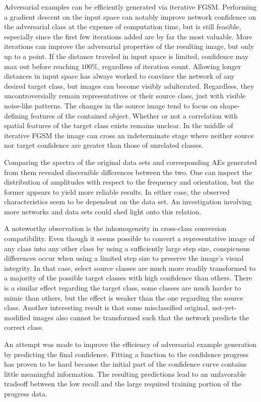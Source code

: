 \documentclass[11pt, a4paper]{article}
\begin{document}
Adversarial examples can be efficiently generated via iterative FGSM. Performing a gradient descent on the input space can notably improve network confidence on the adversarial class at the expense of computation time, but is still feasible, especially since the first few iterations added are by far the most valuable. More iterations can improve the adversarial properties of the resulting image, but only up to a point. If the distance traveled in input space is limited, confidence may max out before reaching $100\%$, regardless of iteration count. Allowing longer distances in input space has always worked to convince the network of any desired target class, but images can become visibly adulterated. Regardless, they uncontroversially remain representatives or their source class, just with visible noise-like patterns. The changes in the source image tend to focus on shape-defining features of the contained object. Whether or not a correlation with spatial features of the target class exists remains unclear. In the middle of iterative FGSM the image can cross an indeterminate stage where neither source nor target confidence are greater than those of unrelated classes.

Comparing the spectra of the original data sets and corresponding AEs generated from them revealed discernible differences between the two. One can inspect the distribution of amplitudes with respect to the frequency and orientation, but the former appears to yield more reliable results. In either case, the observed characteristics seem to be dependent on the data set. An investigation involving more networks and data sets could shed light onto this relation.

A noteworthy observation is the inhomogeneity in cross-class conversion compatibility. Even though it seems possible to convert a representative image of any class into any other class by using a sufficiently large step size, conspicuous differences occur when using a limited step size to preserve the image's visual integrity. In that case, select source classes are much more readily transformed to a majority of the possible target classes with high confidence than others. There is a similar effect regarding the target class, some classes are much harder to mimic than others, but the effect is weaker than the one regarding the source class. Another interesting result is that some misclassified original, not-yet-modified images also cannot be transformed such that the network predicts the correct class.

An attempt was made to improve the efficiency of adversarial example generation by predicting the final confidence. Fitting a function to the confidence progress has proven to be hard because the initial part of the confidence curve contains little meaningful information. The resulting predictions lead to an unfavorable tradeoff between the low recall and the large required training portion of the progress data.
\end{document}
